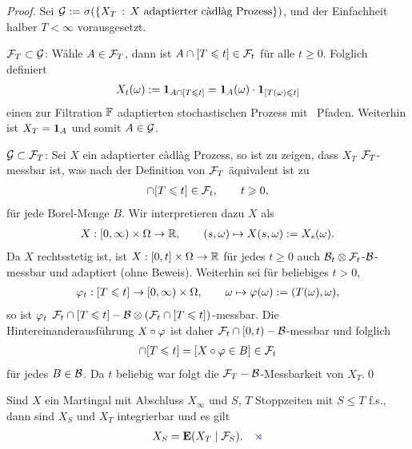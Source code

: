 \begin{proof}
Sei $\GG\defl \sigma(\setdef{X_T}{X \text{ adaptierter càdlàg Prozess}})$, und 
der Einfachheit halber $T < \infty$ vorausgesetzt.

$\mathcal{F}_T\subset \mathcal{G}$: Wähle $A\in\mathcal{F}_T$, dann ist $A\cap[T\leqslant t]\in\mathcal{F}_t$ für alle
$t\ge 0$. Folglich definiert
\begin{align*}
X_t(\omega) := \mathbf{1}_{A\cap [T\leqslant t]} = \mathbf{1}_{A}(\omega)\cdot
\mathbf{1}_{[T(\omega) \leqslant t]}
\end{align*}
einen zur Filtration $\mathbb{F}$ adaptierten stochastischen Prozess mit \cadlag\
Pfaden. Weiterhin ist $X_T=\mathbf{1}_A$ und somit $A\in\mathcal{G}$.

$\mathcal{G}\subset \mathcal{F}_T$: Sei $X$ ein adaptierter càdlàg Prozess, so ist zu zeigen,
dass $X_T$ $\mathcal{F}_T$-messbar ist, was nach der Definition von $\mathcal{F}_T$ äquivalent
ist zu
\begin{align*}
[X_T\in B]\cap [T\le t]\in\FF_t,\qquad t\ge 0,
\end{align*}
für jede Borel-Menge $B$. Wir interpretieren dazu $X$ als
\begin{align*}
X: [0,\infty)\times \Omega \to \mathbb{R},\qquad (s,\omega)\mapsto X(s,\omega)
:= X_s(\omega).
\end{align*}
Da $X$ rechtsstetig ist, ist $X: [0,t]\times\Omega\to\mathbb{R}$ für jedes $t\ge 0$ auch
$\mathcal{B}_t\otimes \mathcal{F}_t$-$\mathcal{B}$-messbar und adaptiert (ohne Beweis). Weiterhin sei
für beliebiges $t > 0$,
\begin{align*}
\varphi_t : [T\leqslant t] \to [0,\infty)\times \Omega,\qquad \omega\mapsto
\varphi(\omega):= (T(\omega),\omega),
\end{align*}
so ist $\varphi_t$ $\mathcal{F}_t\cap[T\leqslant t]-\mathcal{B}\otimes (\mathcal{F}_t\cap [T\leqslant t])$-messbar.
Die Hintereinanderausführung $X\circ \varphi$ ist daher $\mathcal{F}_t\cap [0,t)-
\mathcal{B}$-messbar und folglich
\begin{align*}
[X_T\in B]\cap [T\le t] = [X\circ\ph\in B] \in \FF_t
\end{align*}
für jedes $B\in\mathcal{B}$. Da $t$ beliebig war folgt die $\mathcal{F}_T-\mathcal{B}$-Messbarkeit von
$X_T$.\qed
\end{proof}



\begin{prop}
\label{Optional Sampling Theorem}
\label{prop:1.13}
Sind $X$ ein Martingal mit
  Abschluss $X_\infty$ und $S$, $T$ Stoppzeiten mit $S\le T$ f.s., dann sind
  $X_S$ und $X_T$ integrierbar und es gilt
  \begin{align*}
X_S=\E(X_T\mid\FF_S).\fish
\end{align*}
\end{prop}

